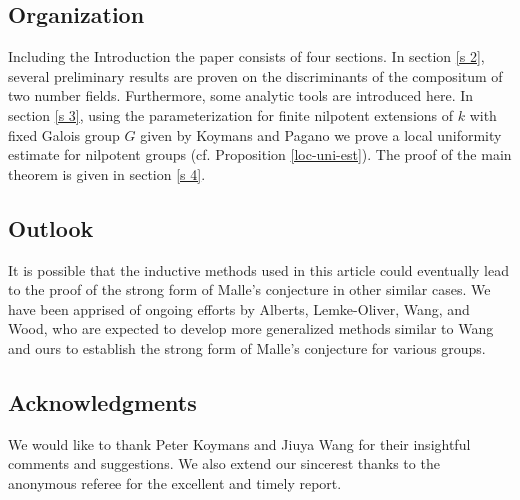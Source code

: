 \documentclass[11pt]{amsart}
\numberwithin{equation}{section}
\begin{document}
\subsection{Organization}
\par Including the Introduction the paper consists of four sections. In section \ref{s 2}, several preliminary results are proven on the discriminants of the compositum of two number fields. Furthermore, some analytic tools are introduced here. In section \ref{s 3}, using the parameterization for finite nilpotent extensions of $k$ with fixed Galois group $G$ given by Koymans and Pagano \cite{koymanspagano2023} we prove a local uniformity estimate for nilpotent groups (cf. Proposition \ref{loc-uni-est}). The proof of the main theorem is given in section \ref{s 4}.

\subsection{Outlook} It is possible that the inductive methods used in this article could eventually lead to the proof of the strong form of Malle's conjecture in other similar cases. We have been apprised of ongoing efforts by Alberts, Lemke-Oliver, Wang, and Wood, who are expected to develop more generalized methods similar to Wang and ours to establish the strong form of Malle's conjecture for various groups.

\subsection*{Acknowledgments} We would like to thank Peter Koymans and Jiuya Wang for their insightful comments and suggestions. We also extend our sincerest thanks to the anonymous referee for the excellent and timely report. 
\end{document}

